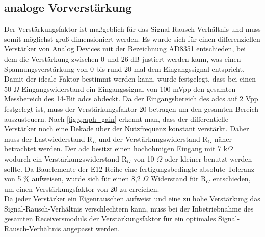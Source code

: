 \subsection{analoge Vorverstärkung}
Der Verstärkungsfaktor ist maßgeblich für das Signal-Rausch-Verhältnis und muss somit möglichst groß dimensioniert werden. Es wurde sich für einen differenziellen Verstärker von Analog Devices mit der Bezeichnung AD8351 entschieden\cite{ad8351}, bei dem die Verstärkung zwischen 0 und 26 dB justiert werden kann, was einen Spannungsverstärkung von 0 bis rund 20 mal dem Eingangssignal entspricht.\\
Damit der ideale Faktor bestimmt werden kann, wurde festgelegt, dass bei einen 50 $\Omega$ Eingangswiderstand ein Eingangssignal von 100 mVpp den gesamten Messbereich des 14-Bit \ac{adc}s abdeckt. Da der Eingangsbereich des \ac{adc}s auf 2 Vpp festgelegt ist, muss der Verstärkungsfaktor 20 betragen um den gesamten Bereich auszusteuern. Nach \autoref{fig:graph_gain} erkennt man, dass der differentielle Verstärker noch eine Dekade über der Nutzfrequenz konstant verstärkt. Daher muss der Lastwiederstand R$_L$ und der Verstärkungswiderstand R$_G$ näher betrachtet werden. Der \ac{adc} besitzt einen hochohmigen Eingang mit 7 k$\Omega$ wodurch ein Verstärkungswiderstand R$_G$ von 10 $\Omega$ oder kleiner benutzt werden sollte.
Da Bauelemente der E12 Reihe eine fertigungsbedingte absolute Toleranz von 5 $\%$ aufweisen, wurde sich für einen 8,2 $\Omega$ Widerstand für R$_G$ entschieden, um einen Verstärkungsfaktor von 20 zu erreichen.\\
Da jeder Verstärker ein Eigenrauschen aufweist und eine zu hohe Verstärkung das Signal-Rausch-Verhältnis verschlechtern kann, muss bei der Inbetriebnahme des gesamten Receiversmoduls der Verstärkungsfaktor für ein optimales Signal-Rausch-Verhältnis angepasst werden.
